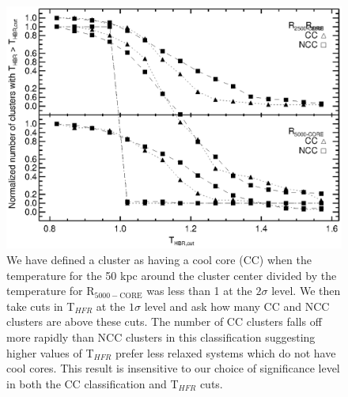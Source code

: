\documentclass{emulateapj}
\newcommand{\tf}{T$_{HFR}$ }
\begin{document}
\clearpage
\begin{figure}[htp]
\begin{center}
\includegraphics[scale=1.0]{cc_ncc_bin}
\caption{\small We have defined a cluster as having a cool core (CC)
when the temperature for the 50 kpc around the cluster center divided
by the temperature for R$_{5000-\text{CORE}}$ was less than 1 at the
$2\sigma$ level. We then take cuts in \tf at the $1\sigma$
level and ask how many CC and NCC clusters are above these cuts. The
number of CC clusters falls off more rapidly than NCC clusters in this
classification suggesting higher values of \tf prefer less
relaxed systems which do not have cool cores. This result is
insensitive to our choice of significance level in both the CC
classification and \tf cuts.}
\label{fig:cc_ncc_bin}
\end{center}
\end{figure}

\end{document}
